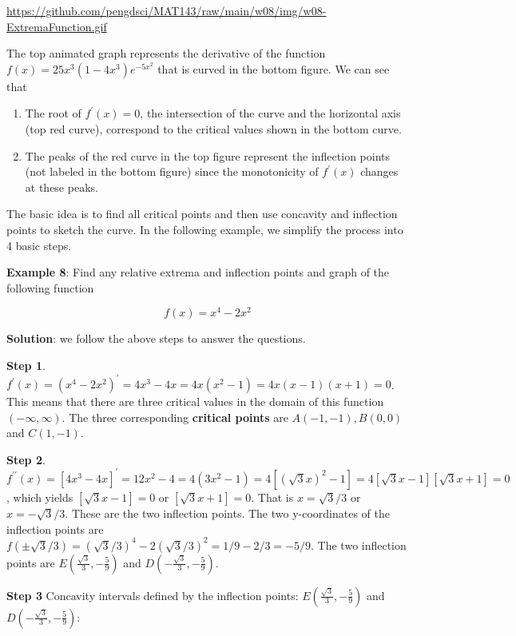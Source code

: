 \documentclass[
]{book}
\begin{document}
\url{https://github.com/pengdsci/MAT143/raw/main/w08/img/w08-ExtremaFunction.gif}

The top animated graph represents the derivative of the function \(f(x) = 25x^3(1-4x^3)e^{-5x^2}\) that is curved in the bottom figure. We can see that

\begin{enumerate}
\def\labelenumi{\arabic{enumi}.}
\item
  The root of \(f^\prime(x) = 0\), the intersection of the curve and the horizontal axis (top red curve), correspond to the critical values shown in the bottom curve.
\item
  The peaks of the red curve in the top figure represent the inflection points (not labeled in the bottom figure) since the monotonicity of \(f^\prime(x)\) changes at these peaks.
\end{enumerate}

\hfill\break

The basic idea is to find all critical points and then use concavity and inflection points to sketch the curve. In the following example, we simplify the process into 4 basic steps.

\hfill\break

\textbf{Example 8}: Find any relative extrema and inflection points and graph of the following function

\[
f(x) = x^4 - 2x^2
\]

\textbf{Solution}: we follow the above steps to answer the questions.

\textbf{Step 1}. \(f^\prime(x) = (x^4 - 2x^2)^\prime = 4x^3 - 4x = 4x(x^2-1) = 4x(x-1)(x+1) = 0\). This means that there are three critical values in the domain of this function \((-\infty, \infty)\). The three corresponding \textbf{critical points} are \(A(-1, -1), B(0, 0)\) and \(C(1, -1)\).

\textbf{Step 2}. \(f^{\prime\prime}(x) = [4x^3 - 4x]^\prime = 12x^2 - 4 = 4(3x^2-1) = 4\left[(\sqrt{3}x)^2 - 1\right] = 4[\sqrt{3}x-1][\sqrt{3}x+1] = 0\), which yields \([\sqrt{3}x-1] = 0\) or \([\sqrt{3}x+1] = 0\). That is \(x = \sqrt{3}/3\) or \(x = -\sqrt{3}/3\). These are the two inflection points. The two y-coordinates of the inflection points are \(f(\pm \sqrt{3}/3) = (\sqrt{3}/3)^4 - 2(\sqrt{3}/3)^2 = 1/9 - 2/3 = -5/9\). The two inflection points are \(E(\frac{\sqrt{3}}{3}, -\frac{5}{9})\) and \(D(-\frac{\sqrt{3}}{3}, -\frac{5}{9})\).

\textbf{Step 3} Concavity intervals defined by the inflection points: \(E(\frac{\sqrt{3}}{3}, -\frac{5}{9})\) and \(D(-\frac{\sqrt{3}}{3}, -\frac{5}{9})\):
\end{document}
